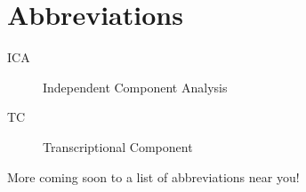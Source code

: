 \chapter*{Abbreviations}
\begin{description}
    \item[ICA]  \tabto{2cm} Independent Component Analysis
    \item[TC]   \tabto{2cm} Transcriptional Component
\end{description}

More coming soon to a list of abbreviations near you!
